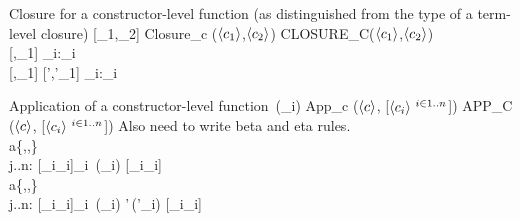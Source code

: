 \documentclass[12pt,twoside,fleqn]{article}
\begin{document}
  {Closure for a constructor-level function (as distinguished
   from the type of a term-level closure)}
  {[\constructor_1,\constructor_2]}
  {Closure\_c ($\langle{c_1}\rangle$,$\langle{c_2}\rangle$)}
  {CLOSURE\_C($\langle{c_1}\rangle$,$\langle{c_2}\rangle$)}
  {}
  {\irule
     {\validconstructor{\context}{\constructor}
          {}\\
      }
     {\validconstructor{\context}
          {[\constructor,\constructor_1]}
         {
              {\cvar_i{:}\kind_i
                }{\kind}}}
   \irule
     {
         {}\\
      }
     {\equivconstructor{\context}
         {[\constructor,\constructor_1]}
         {[\constructor',\constructor'_1]}
         {
              {\cvar_i{:}\kind_i
                }{\kind}}}}

\newcommand{\capplymil}[2]{#1\,(#2)}
  {Application of a constructor-level function}
  {\capplymil{\constructor}{\constructor_i}}
  {App\_c ($\langle{c}\rangle$, [$\langle{c_i}\rangle\ {}^{i\in 1..n}$])}
  {APP\_C ($\langle{c}\rangle$, [$\langle{c_i}\rangle\ {}^{i\in 1..n}$])}
  {Also need to write beta and eta rules.}
  {\irule
    {\validconstructor{\context}{\constructor}
           {}\\
      a\in\{,,\}\\
     \forall j..n:\quad
           {[\cvar_i{\mapsto}\constructor_i]\kind_i}}
    {\validconstructor{\context}
        {\capplymil{\constructor}{\constructor_i}}
        {[\cvar_i{\mapsto}\constructor_i]\kind}}
  \irule
    {
           {}\\
      a\in\{,,\}\\
     \forall j..n:\quad
           {[\cvar_i{\mapsto}\constructor_i]\kind_i}}
    {\equivconstructor{\context}
        {\capplymil{\constructor}{\constructor_i}}
        {\capplymil{\constructor'}{\constructor'_i\super{i}{1..n}}}
        {[\cvar_i{\mapsto}\constructor_i]\kind}}
   }
\end{document}
